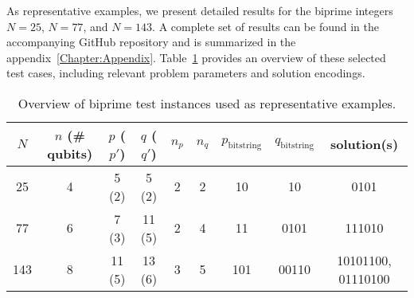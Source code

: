 As representative examples, we present detailed results for the biprime integers $N = 25$, $N = 77$,
and $N = 143$. A complete set of results can be found in the accompanying GitHub repository
and is summarized in the appendix~\ref{Chapter:Appendix}. Table~\ref{tab:instances_overview} provides an overview of
these selected test cases, including relevant problem parameters and solution encodings.
\begin{table}[h]
    \centering
    \begin{tabular}{@{}ccccccccc@{}}
        \toprule
        $N$ & $n$ (\# qubits) & $p$ ($p'$) & $q$ ($q'$) & $n_p$ & $n_q$ & $p_\mathrm{bitstring}$ & $q_\mathrm{bitstring}$ & solution(s) \\
        \midrule
        25  & 4          & 5 (2)      & 5 (2)      & 2     & 2     & 10                     & 10                     & 0101                  \\
        77  & 6          & 7 (3)      & 11 (5)     & 2     & 4     & 11                     & 0101                   & 111010                \\
        143 & 8          & 11 (5)     & 13 (6)     & 3     & 5     & 101                    & 00110                  & 10101100, 01110100    \\
        \bottomrule
    \end{tabular}
    \caption{Overview of biprime test instances used as representative examples.}
    \label{tab:instances_overview}
\end{table}

